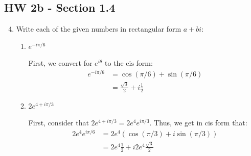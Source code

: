 \subsection*{HW 2b - Section 1.4}
\begin{enumerate}
	\setcounter{enumi}{3}
	\item Write each of the given numbers in rectangular form $a+bi$:
	\begin{enumerate}
		\item $e^{-i\pi/6}$
		\begin{problem}
			First, we convert for $e^{i\theta}$ to the $\text{cis}$ form:
			\begin{align*}
				e^{-i\pi/6}&=\cos(\pi/6) + \sin(\pi/6)\\
				&= \boxed{\frac{\sqrt{3}}2 + i\frac{1}2}
			\end{align*}
		\end{problem}
		\item $2e^{4+i\pi/3}$
		\begin{problem}
			First, consider that $2e^{4+i\pi/3}=2e^4e^{i\pi/3}$. Thus, we get in cis form that:
			\begin{align*}
				2e^4e^{i\pi/6}&=2e^4(\cos(\pi/3)+i\sin(\pi/3))\\
				&= \boxed{2e^4\frac{1}2 + i2e^4\frac{\sqrt{3}}2}
			\end{align*}
		\end{problem}
	
	\end{enumerate}
	

\end{enumerate}
